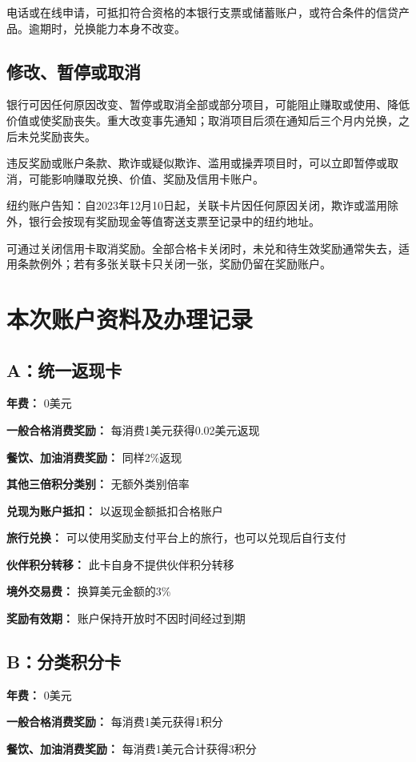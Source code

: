 \documentclass[UTF8,fontset=none,11pt,a4paper]{ctexart}
\begin{document}
电话或在线申请，可抵扣符合资格的本银行支票或储蓄账户，或符合条件的信贷产品。逾期时，兑换能力本身不改变。


\subsection*{修改、暂停或取消}
银行可因任何原因改变、暂停或取消全部或部分项目，可能阻止赚取或使用、降低价值或使奖励丧失。重大改变事先通知；取消项目后须在通知后三个月内兑换，之后未兑奖励丧失。


违反奖励或账户条款、欺诈或疑似欺诈、滥用或操弄项目时，可以立即暂停或取消，可能影响赚取兑换、价值、奖励及信用卡账户。


纽约账户告知：自2023年12月10日起，关联卡片因任何原因关闭，欺诈或滥用除外，银行会按现有奖励现金等值寄送支票至记录中的纽约地址。


可通过关闭信用卡取消奖励。全部合格卡关闭时，未兑和待生效奖励通常失去，适用条款例外；若有多张关联卡只关闭一张，奖励仍留在奖励账户。


\section*{本次账户资料及办理记录}
\subsection*{A：统一返现卡}
\textbf{年费：} 0美元


\textbf{一般合格消费奖励：} 每消费1美元获得0.02美元返现


\textbf{餐饮、加油消费奖励：} 同样2\%返现


\textbf{其他三倍积分类别：} 无额外类别倍率


\textbf{兑现为账户抵扣：} 以返现金额抵扣合格账户


\textbf{旅行兑换：} 可以使用奖励支付平台上的旅行，也可以兑现后自行支付


\textbf{伙伴积分转移：} 此卡自身不提供伙伴积分转移


\textbf{境外交易费：} 换算美元金额的3\%


\textbf{奖励有效期：} 账户保持开放时不因时间经过到期


\subsection*{B：分类积分卡}
\textbf{年费：} 0美元


\textbf{一般合格消费奖励：} 每消费1美元获得1积分


\textbf{餐饮、加油消费奖励：} 每消费1美元合计获得3积分
\end{document}
